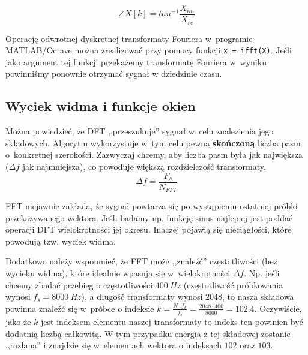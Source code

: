 \begin{equation}\label{lab2/eq/phaseComplex}
	\angle X[k] = tan^{-1} \frac{X_{im}}{X_{re}}
\end{equation}

Operację odwrotnej dyskretnej transformaty Fouriera w~programie MATLAB/Octave można zrealizować przy pomocy funkcji \texttt{x = ifft(X)}. Jeśli jako argument tej funkcji przekażemy transformatę Fouriera w~wyniku powinniśmy ponownie otrzymać sygnał w dziedzinie czasu.


\subsection{Wyciek widma i funkcje okien}
Można powiedzieć, że DFT ,,przeszukuje'' sygnał w~celu znalezienia jego składowych. Algorytm wykorzystuje w~tym celu pewną \textbf{skończoną} liczba pasm o~konkretnej szerokości. Zazwyczaj chcemy, aby liczba pasm była jak największa ($\Delta f$ jak najmniejsza), co powoduje większą rozdzielczość transformaty.
\begin{equation}\label{lab2/lst/frequencyResolution}
	\Delta f = \frac{F_s}{N_{FFT}}
\end{equation}

FFT niejawnie zakłada, że sygnał powtarza się po wystąpieniu ostatniej próbki przekazywanego wektora. Jeśli badamy np. funkcję sinus najlepiej jest poddać operacji DFT wielokrotności jej okresu. Inaczej pojawią się nieciągłości, które powodują tzw. wyciek widma. 

Dodatkowo należy wspomnieć, że FFT może ,,znaleźć'' częstotliwości (bez wycieku widma), które idealnie wpasują się w~wielokrotności $\Delta f$. Np. jeśli chcemy zbadać przebieg o częstotliwości $400~Hz$ (częstotliwość próbkowania wynosi $f_s = 8000~Hz$), a długość transformaty wynosi 2048, to nasza składowa powinna znaleźć się w~próbce o indeksie $k = \frac{N\cdot f_k}{f_s} = \frac{2048\cdot400}{8000} = 102.4$. Oczywiście, jako że $k$ jest indeksem elementu naszej transformaty to indeks ten powinien być dodatnią liczbą całkowitą. W tym przypadku energia z tej składowej zostanie ,,rozlana'' i znajdzie się w~elementach wektora o indeksach $102$ oraz $103$.

